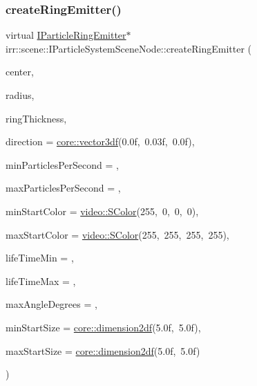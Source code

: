 \subsubsection{\texorpdfstring{create\+Ring\+Emitter()}{createRingEmitter()}}
{\footnotesize\ttfamily virtual \hyperlink{classirr_1_1scene_1_1IParticleRingEmitter}{I\+Particle\+Ring\+Emitter}$\ast$ irr\+::scene\+::\+I\+Particle\+System\+Scene\+Node\+::create\+Ring\+Emitter (\begin{DoxyParamCaption}\item[{const \hyperlink{namespaceirr_1_1core_a06f169d08b5c429f5575acb7edbad811}{core\+::vector3df} \&}]{center,  }\item[{\hyperlink{namespaceirr_a0277be98d67dc26ff93b1a6a1d086b07}{f32}}]{radius,  }\item[{\hyperlink{namespaceirr_a0277be98d67dc26ff93b1a6a1d086b07}{f32}}]{ring\+Thickness,  }\item[{const \hyperlink{namespaceirr_1_1core_a06f169d08b5c429f5575acb7edbad811}{core\+::vector3df} \&}]{direction = {\ttfamily \hyperlink{namespaceirr_1_1core_a06f169d08b5c429f5575acb7edbad811}{core\+::vector3df}(0.0f,~0.03f,~0.0f)},  }\item[{\hyperlink{namespaceirr_a0416a53257075833e7002efd0a18e804}{u32}}]{min\+Particles\+Per\+Second = {},  }\item[{\hyperlink{namespaceirr_a0416a53257075833e7002efd0a18e804}{u32}}]{max\+Particles\+Per\+Second = {},  }\item[{const \hyperlink{classirr_1_1video_1_1SColor}{video\+::\+S\+Color} \&}]{min\+Start\+Color = {\ttfamily \hyperlink{classirr_1_1video_1_1SColor}{video\+::\+S\+Color}(255,~0,~0,~0)},  }\item[{const \hyperlink{classirr_1_1video_1_1SColor}{video\+::\+S\+Color} \&}]{max\+Start\+Color = {\ttfamily \hyperlink{classirr_1_1video_1_1SColor}{video\+::\+S\+Color}(255,~255,~255,~255)},  }\item[{\hyperlink{namespaceirr_a0416a53257075833e7002efd0a18e804}{u32}}]{life\+Time\+Min = {},  }\item[{\hyperlink{namespaceirr_a0416a53257075833e7002efd0a18e804}{u32}}]{life\+Time\+Max = {},  }\item[{\hyperlink{namespaceirr_ac66849b7a6ed16e30ebede579f9b47c6}{s32}}]{max\+Angle\+Degrees = {},  }\item[{const \hyperlink{namespaceirr_1_1core_af6dc5c45ff13e7712758c827ff58676b}{core\+::dimension2df} \&}]{min\+Start\+Size = {\ttfamily \hyperlink{namespaceirr_1_1core_af6dc5c45ff13e7712758c827ff58676b}{core\+::dimension2df}(5.0f,~5.0f)},  }\item[{const \hyperlink{namespaceirr_1_1core_af6dc5c45ff13e7712758c827ff58676b}{core\+::dimension2df} \&}]{max\+Start\+Size = {\ttfamily \hyperlink{namespaceirr_1_1core_af6dc5c45ff13e7712758c827ff58676b}{core\+::dimension2df}(5.0f,~5.0f)} }\end{DoxyParamCaption})\hspace{0.3cm}{\ttfamily [pure virtual]}}



